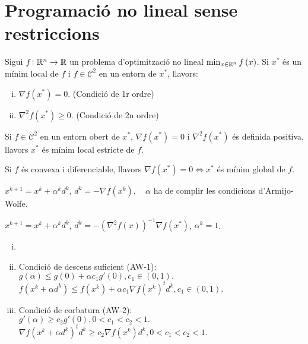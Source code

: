 \section{Programaci\'o no lineal sense restriccions}

\begin{teo*}
    Sigui $f \colon \mathbb{R}^n \to \mathbb{R}$ un problema d'optimitzaci\'o no lineal $\min_{x\in\mathbb{R}^n} f\left( x \right)$. Si $x^*$ \'es un m\'inim local de $f$ i $f \in \mathcal{C}^2$ en un entorn de $x^*$, llavors:
    \begin{enumerate}[i)]
        \item $\nabla f\left( x^* \right) = 0$. (Condici\'o de 1r ordre)
        \item $\nabla^2 f\left( x^* \right) \geq 0$. (Condici\'o de 2n ordre)
    \end{enumerate}
\end{teo*}
\begin{teo*}
    Si $f \in \mathcal{C}^2$ en un entorn obert de $x^*$, $\nabla f\left( x^* \right) = 0$ i $\nabla^2 f\left( x^* \right)$ \'es definida positiva, llavors $x^*$ \'es m\'inim local estricte de $f$.
\end{teo*}
\begin{teo*}
    Si $f$ \'es convexa i diferenciable, llavors $\nabla f\left( x^* \right) = 0 \iff x^*$ \'es m\'inim global de $f$.
\end{teo*}
\begin{met}
    $x^{k+1} = x^k + \alpha^kd^k$, \quad $d^k = -\nabla f\left( x^k \right), \quad \alpha$ ha de complir les condicions d'Armijo-Wolfe.
\end{met}
\begin{met}[de Newton]
    $x^{k+1} = x^k + \alpha^kd^k$, \quad $d^k = -\left( \nabla^2 f\left( x \right) \right)^{-1} \nabla f\left( x^* \right)$, \quad$\alpha^k = 1$.
\end{met}
\begin{prop}
    \begin{enumerate}[i)]
        \item[]
        \item Condici\'o de descens suficient (AW-1): \\
            \indent $g\left( \alpha \right) \leq g\left( 0 \right) + \alpha c_1g'\left( 0 \right), c_1 \in (0,1).$ \\
            \indent $f\left( x^k + \alpha d^k \right) \leq f\left( x^k \right) + \alpha c_1 \nabla f\left( x^k \right)^t d^k, c_1 \in (0,1).$
        \item Condici\'o de corbatura (AW-2): \\
            \indent $g'\left( \alpha \right) \geq c_2 g'\left( 0 \right), 0 < c_1 < c_2 < 1.$ \\
        \indent $\nabla f\left( x^k + \alpha d^k \right)^td^k \geq c_2 \nabla f\left( x^k \right)d^k, 0 < c_1 < c_2 < 1$.
    \end{enumerate}
\end{prop}

